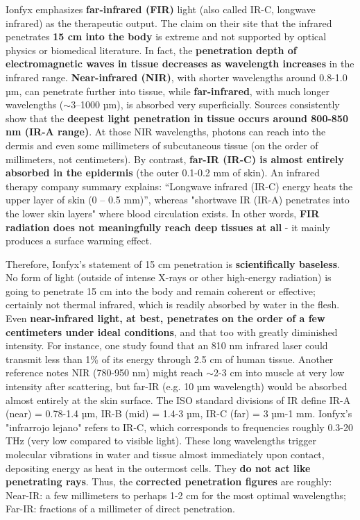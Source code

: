 \documentclass{article}
\begin{document}
Ionfyx emphasizes \textbf{far-infrared (FIR)} light (also called IR-C, longwave infrared) as the therapeutic output. The claim on their site that the infrared penetrates \textbf{15 cm into the body} is extreme and not supported by optical physics or biomedical literature. In fact, the \textbf{penetration depth of electromagnetic waves in tissue decreases as wavelength increases} in the infrared range. \textbf{Near-infrared (NIR)}, with shorter wavelengths around 0.8-1.0 µm, can penetrate further into tissue, while \textbf{far-infrared}, with much longer wavelengths ($\sim$3–1000 µm), is absorbed very superficially. Sources consistently show that the \textbf{deepest light penetration in tissue occurs around 800-850 nm (IR-A range)}. At those NIR wavelengths, photons can reach into the dermis and even some millimeters of subcutaneous tissue (on the order of millimeters, not centimeters). By contrast, \textbf{far-IR (IR-C) is almost entirely absorbed in the epidermis} (the outer 0.1-0.2 mm of skin). An infrared therapy company summary explains: “Longwave infrared (IR-C) energy heats the upper layer of skin (0 – 0.5 mm)”, whereas "shortwave IR (IR-A) penetrates into the lower skin layers" where blood circulation exists. In other words, \textbf{FIR radiation does not meaningfully reach deep tissues at all} - it mainly produces a surface warming effect.

Therefore, Ionfyx's statement of 15 cm penetration is \textbf{scientifically baseless}. No form of light (outside of intense X-rays or other high-energy radiation) is going to penetrate 15 cm into the body and remain coherent or effective; certainly not thermal infrared, which is readily absorbed by water in the flesh. Even \textbf{near-infrared light, at best, penetrates on the order of a few centimeters under ideal conditions}, and that too with greatly diminished intensity. For instance, one study found that an 810 nm infrared laser could transmit less than 1\% of its energy through 2.5 cm of human tissue. Another reference notes NIR (780-950 nm) might reach $\sim$2-3 cm into muscle at very low intensity after scattering, but far-IR (e.g. 10 µm wavelength) would be absorbed almost entirely at the skin surface. The ISO standard divisions of IR define IR-A (near) = 0.78-1.4 µm, IR-B (mid) = 1.4-3 µm, IR-C (far) = 3 µm-1 mm. Ionfyx's "infrarrojo lejano" refers to IR-C, which corresponds to frequencies roughly 0.3-20 THz (very low compared to visible light). These long wavelengths trigger molecular vibrations in water and tissue almost immediately upon contact, depositing energy as heat in the outermost cells. They \textbf{do not act like penetrating rays}. Thus, the \textbf{corrected penetration figures} are roughly: Near-IR: a few millimeters to perhaps 1-2 cm for the most optimal wavelengths; Far-IR: fractions of a millimeter of direct penetration.
\end{document}
